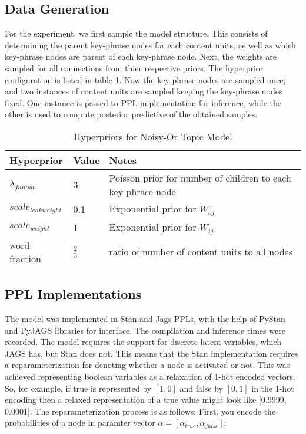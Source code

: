 \documentclass[../main.tex]{subfiles}
\begin{document}
\subsection{Data Generation}
For the experiment, we first sample the model structure.
This consists of determining the parent key-phrase nodes for each content units, as well as which key-phrase nodes are parent of each key-phrase node.
Next, the weights are sampled for all connections from thier respective priors.
The hyperprior configuration is listed in table \ref{tab:table_NOT}.
Now the key-phrase nodes are sampled once; and two instances of content units are sampled keeping the key-phrase nodes fixed.
One instance is passed to PPL implementation for inference, while the other is used to compute posterior predictive of the obtained samples.
\begin{table}[h]
 \caption{Hyperpriors for Noisy-Or Topic Model}
  \centering
  \begin{tabular}{lll}              \\
    \cmidrule(r){1-3}
    Hyperprior             & Value         & Notes  \\
    \midrule
    $\lambda_{fanout}$     & 3             & Poisson prior for number of children to each key-phrase node  \\
    $scale_{leak weight}$  & 0.1           & Exponential prior for $W_{oj}$ \\
    $scale_{weight}$       & 1             & Exponential prior for $W_{ij}$ \\
    word fraction          & $\frac{2}{3}$ & ratio of number of content units to all nodes \\
    \bottomrule
  \end{tabular}
  \label{tab:table_NOT}
\end{table}
\subsection{PPL Implementations}
The model was implemented in Stan and Jags PPLs, with the help of PyStan\cite{PyStan} and PyJAGS\cite{PyJAGS} libraries for interface.
The compilation and inference times were recorded.
The model requires the support for discrete latent variables, which JAGS has, but Stan does not.
This means that the Stan implementation requires a reparameterization for denoting whether a node is activated or not.
This was achieved representing boolean variables as a relaxation of 1-hot encoded vectors\cite{maddison2016concrete}.
So, for example, if true is represented by $[1, 0]$ and false by $[0, 1]$ in the 1-hot encoding then a relaxed representation of a true value might look like [0.9999, 0.0001].
The reparameterization process is as follows:
First, you encode the probabilities of a node in paramter vector $\alpha = [\alpha_{true}, \alpha_{false}]$:
\end{document}
